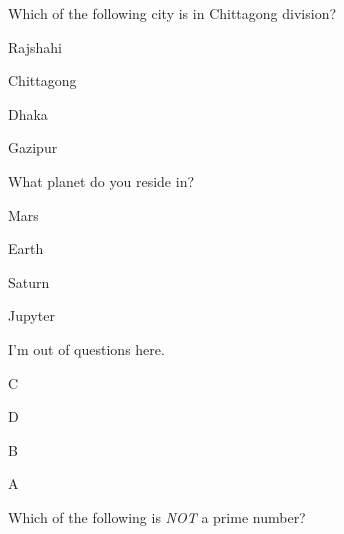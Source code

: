 \documentclass[12pt]{exam}
\begin{document}
\begin{questions}
\begin{oneparchoices}
        
        
        
        
        \end{oneparchoices}

    \question Which of the following city is in Chittagong division?
    
        \begin{oneparchoices}
        
            \choice Rajshahi
        
            \choice Chittagong
        
            \choice Dhaka
        
            \choice Gazipur
        
        \end{oneparchoices}

    \question What planet do you reside in?
    
        \begin{oneparchoices}
        
            \choice Mars
        
            \choice Earth
        
            \choice Saturn
        
            \choice Jupyter
        
        \end{oneparchoices}

    \question I'm out of questions here.
    
        \begin{oneparchoices}
        
            \choice C
        
            \choice D
        
            \choice B
        
            \choice A
        
        \end{oneparchoices}

    \question Which of the following is \textit{NOT} a prime number?
    
        \begin{oneparchoices}
        
        
        

\end{oneparchoices}
\end{questions}
\end{document}
